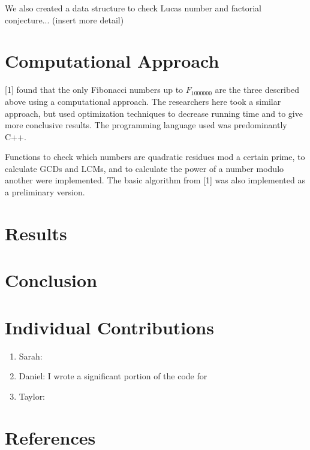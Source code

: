 \documentclass[11pt]{article}
\begin{document}
We also created a data structure to check Lucas number and factorial conjecture... (insert more detail)

\section{Computational Approach}

[1] found that the only Fibonacci numbers up to $F_{1000000}$ are the three described above using a computational approach. The researchers here took a similar approach, but used optimization techniques to decrease running time and to give more conclusive results. The programming language used was predominantly C++.

Functions to check which numbers are quadratic residues mod a certain prime, to calculate GCDs and LCMs, and to calculate the power of a number modulo another were implemented. The basic algorithm from [1] was also implemented as a preliminary version.

\section{Results}



\section{Conclusion}



\section{Individual Contributions}

\begin{enumerate}
\item Sarah:

\item Daniel: I wrote a significant portion of the code for 

\item Taylor:
\end{enumerate}

\section{References}
\end{document}
